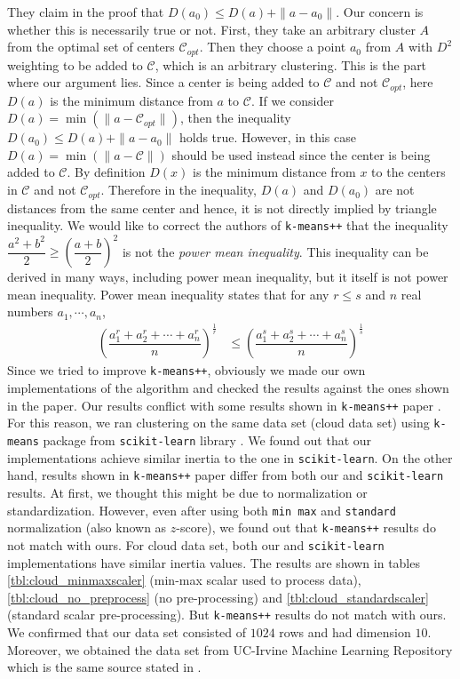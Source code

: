 \documentclass[twoside, 11pt]{article}
\newcommand{\C}{\mathcal{C}}
\begin{document}
	They claim in the proof that $D(a_0)\leq D(a)+\|a-a_0\|$. Our concern is whether this is necessarily true or not. First, they take an arbitrary cluster $A$ from the optimal set of centers $\C_{opt}$. Then they choose a point $a_0$ from $A$ with $D^2$ weighting to be added to $\C$, which is an arbitrary clustering. This is the part where our argument lies. Since a center is being added to $\C$ and not $\C_{opt}$, here $D(a)$ is the minimum distance from $a$ to $\C$. If we consider $D(a)=\min(\|a-\C_{opt}\|)$, then the inequality $D(a_0)\leq D(a)+\|a-a_0\|$ holds true. However, in this case $D(a)=\min(\|a-\C\|)$ should be used instead since the center is being added to $\C$. By definition $D(x)$ is the minimum distance from $x$ to the centers in $\C$ and not $\C_{opt}$. Therefore in the inequality, $D(a)$ and $D(a_0)$ are not distances from the same center and hence, it is not directly implied by triangle inequality. We would like to correct the authors of \texttt{k-means++} that the inequality $\dfrac{a^2+b^2}{2} \geq \left(\dfrac{a+b}{2}\right)^2$ is not the \textit{power mean inequality}. This inequality can be derived in many ways, including power mean inequality, but it itself is not power mean inequality. Power mean inequality states that for any $r\leq s$ and $n$ real numbers $a_1,\cdots,a_n$,
		\begin{align*}
			\left(\dfrac{a_1^r+a_2^r+\cdots+a_n^r}{n}\right)^{\frac{1}{r}} & \leq \left(\dfrac{a_1^s+a_2^s+\cdots+a_n^s}{n}\right)^{\frac{1}{s}}
		\end{align*}
	Since we tried to improve \texttt{k-means++}, obviously we made our own implementations of the algorithm and checked the results against the ones shown in the paper. Our results conflict with some results shown in \texttt{k-means++} paper \cite{kmeans++}. For this reason, we ran clustering on the same data set (cloud data set) using \texttt{k-means} package from \texttt{scikit-learn} library \citep{sklearn}. We found out that our implementations achieve similar inertia to the one in \texttt{scikit-learn}. On the other hand, results shown in \texttt{k-means++} paper differ from both our and \texttt{scikit-learn} results. At first, we thought this might be due to normalization or standardization. However, even after using both \texttt{min max} and \texttt{standard} normalization (also known as $z$-score), we found out that \texttt{k-means++} results do not match with ours. For cloud data set, both our and \texttt{scikit-learn} implementations have similar inertia values. The results are shown in tables \ref{tbl:cloud_minmaxscaler} (min-max scalar used to process data), \ref{tbl:cloud_no_preprocess} (no pre-processing) and \ref{tbl:cloud_standardscaler} (standard scalar pre-processing). But \texttt{k-means++} results \citep[Table $3$]{kmeans++} do not match with ours. We confirmed that our data set consisted of $1024$ rows and had dimension $10$. Moreover, we obtained the data set from UC-Irvine Machine Learning Repository which is the same source stated in \citet[Section $6.1$]{kmeans++}. 
	
\end{document}
